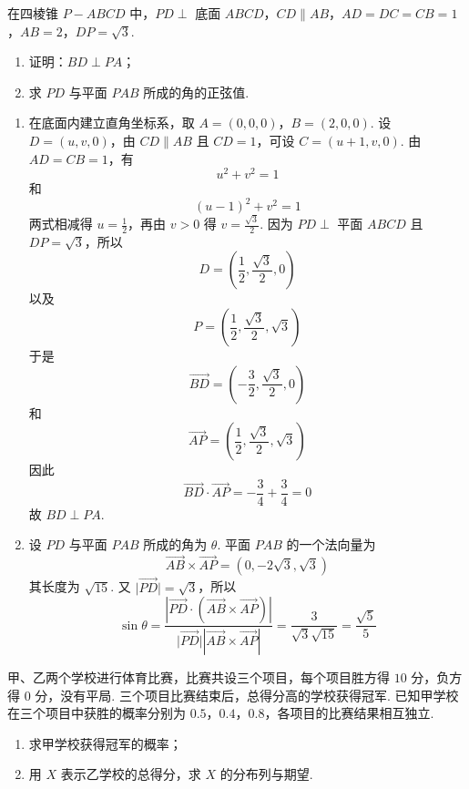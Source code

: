 \begin{problem}
在四棱锥 \(P-ABCD\) 中，\(PD\perp\) 底面 \(ABCD\)，\(CD\parallel AB\)，\(AD=DC=CB=1\)，\(AB=2\)，\(DP=\sqrt3\).

\begin{enumerate}
\item 证明：\(BD\perp PA\)；
\item 求 \(PD\) 与平面 \(PAB\) 所成的角的正弦值.
\end{enumerate}

\end{problem}

\begin{solution}
\begin{enumerate}
\item 在底面内建立直角坐标系，取 \(A=(0,0,0)\)，\(B=(2,0,0)\). 设 \(D=(u,v,0)\)，由 \(CD\parallel AB\) 且 \(CD=1\)，可设 \(C=(u+1,v,0)\). 由 \(AD=CB=1\)，有
\[
u^2+v^2=1
\]
和
\[
(u-1)^2+v^2=1
\]
两式相减得 \(u=\frac12\)，再由 \(v>0\) 得 \(v=\frac{\sqrt3}{2}\). 因为 \(PD\perp\) 平面 \(ABCD\) 且 \(DP=\sqrt3\)，所以
\[
D=\left(\frac12,\frac{\sqrt3}{2},0\right)
\]
以及
\[
P=\left(\frac12,\frac{\sqrt3}{2},\sqrt3\right)
\]
于是
\[
\overrightarrow{BD}=\left(-\frac32,\frac{\sqrt3}{2},0\right)
\]
和
\[
\overrightarrow{AP}=\left(\frac12,\frac{\sqrt3}{2},\sqrt3\right)
\]
因此
\[
\overrightarrow{BD}\cdot\overrightarrow{AP}=-\frac34+\frac34=0
\]
故 \(BD\perp PA\).
\item 设 \(PD\) 与平面 \(PAB\) 所成的角为 \(\theta\). 平面 \(PAB\) 的一个法向量为
\[
\overrightarrow{AB}\times\overrightarrow{AP}=(0,-2\sqrt3,\sqrt3)
\]
其长度为 \(\sqrt{15}\). 又 \(\lvert\overrightarrow{PD}\rvert=\sqrt3\)，所以
\[
\sin\theta
=\frac{\left|\overrightarrow{PD}\cdot\left(\overrightarrow{AB}\times\overrightarrow{AP}\right)\right|}{\lvert\overrightarrow{PD}\rvert\left\lvert\overrightarrow{AB}\times\overrightarrow{AP}\right\rvert}
=\frac{3}{\sqrt3\sqrt{15}}
=\frac{\sqrt5}{5}
\]
\end{enumerate}
\end{solution}

\begin{problem}
甲、乙两个学校进行体育比赛，比赛共设三个项目，每个项目胜方得 \(10\) 分，负方得 \(0\) 分，没有平局. 三个项目比赛结束后，总得分高的学校获得冠军. 已知甲学校在三个项目中获胜的概率分别为 \(0.5\)，\(0.4\)，\(0.8\)，各项目的比赛结果相互独立.

\begin{enumerate}
\item 求甲学校获得冠军的概率；
\item 用 \(X\) 表示乙学校的总得分，求 \(X\) 的分布列与期望.
\end{enumerate}
\end{problem}

